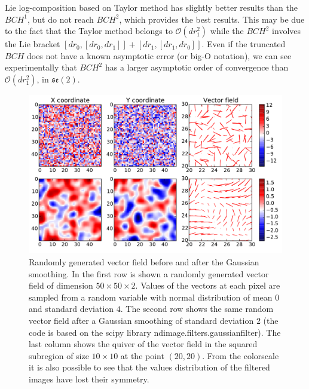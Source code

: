 Lie log-composition based on Taylor method has slightly better results than the $BCH^1$, but do not reach $BCH^2$, which provides the best results. This may be due to the fact that the Taylor method belongs to $\mathcal{O}(dr_1^2)$ while the $BCH^2$ involves the Lie bracket $[dr_0,[dr_0, dr_1]] + [dr_1,[dr_1, dr_0]]$. Even if the truncated $BCH$ does not have a known asymptotic error (or big-O notation), we can see experimentally that $BCH^2$ has a larger asymptotic order of convergence than $\mathcal{O}(dr_1^2)$, in $\mathfrak{se}(2)$.
%
\begin{figure}[!ht]
	\includegraphics[scale=0.70]{figures/svf_gaussian_smoothing_effects.pdf}
	\caption{Randomly generated vector field before and after the Gaussian smoothing. In the first row is shown a randomly generated vector field of dimension $50\times 50 \times 2$. Values of the vectors at each pixel are sampled from a random variable with normal distribution of mean $0$ and standard deviation $4$. The second row shows the same random vector field after a Gaussian smoothing of standard deviation $2$ (the code is based on the scipy library ndimage.filters.gaussian\textunderscore filter). The last column shows the quiver of the vector field in the squared subregion of size $10\times 10$ at the point $(20,20)$. From the colorscale it is also possible to see that the values distribution of the filtered images have lost their symmetry. }
	\label{fig:SVF_gaussian_smoothing_effects}
\end{figure}

